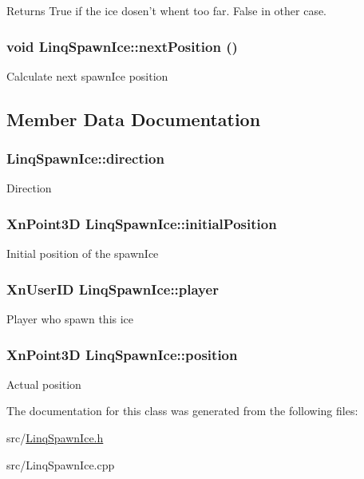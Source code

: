 \begin{DoxyReturn}{Returns}
True if the ice dosen't whent too far. False in other case. 
\end{DoxyReturn}
\hypertarget{classLinqSpawnIce_aa4db7809c414481a0e1ca7c2241af01d}{
\subsubsection[{nextPosition}]{\setlength{\rightskip}{0pt plus 5cm}void LinqSpawnIce::nextPosition ()}}
\label{classLinqSpawnIce_aa4db7809c414481a0e1ca7c2241af01d}
Calculate next spawnIce position 

\subsection{Member Data Documentation}
\hypertarget{classLinqSpawnIce_a2da782100e9d1c549ea3b4c8cbadc2cb}{
\subsubsection[{direction}]{ {\bf LinqSpawnIce::direction}}}
\label{classLinqSpawnIce_a2da782100e9d1c549ea3b4c8cbadc2cb}
Direction \hypertarget{classLinqSpawnIce_a0ffb74516ffb532b8ba0184f88b5f642}{
\subsubsection[{initialPosition}]{\setlength{\rightskip}{0pt plus 5cm}XnPoint3D {\bf LinqSpawnIce::initialPosition}}}
\label{classLinqSpawnIce_a0ffb74516ffb532b8ba0184f88b5f642}
Initial position of the spawnIce \hypertarget{classLinqSpawnIce_aece9d500d9248dd9e6fe51b3ed1a7f6d}{
\subsubsection[{player}]{\setlength{\rightskip}{0pt plus 5cm}XnUserID {\bf LinqSpawnIce::player}}}
\label{classLinqSpawnIce_aece9d500d9248dd9e6fe51b3ed1a7f6d}
Player who spawn this ice \hypertarget{classLinqSpawnIce_ad6c2e52cc6a9b88a3c089ae191939e13}{
\subsubsection[{position}]{\setlength{\rightskip}{0pt plus 5cm}XnPoint3D {\bf LinqSpawnIce::position}}}
\label{classLinqSpawnIce_ad6c2e52cc6a9b88a3c089ae191939e13}
Actual position 

The documentation for this class was generated from the following files:\begin{DoxyCompactItemize}
\item 
src/\hyperlink{LinqSpawnIce_8h}{LinqSpawnIce.h}\item 
src/LinqSpawnIce.cpp\end{DoxyCompactItemize}
